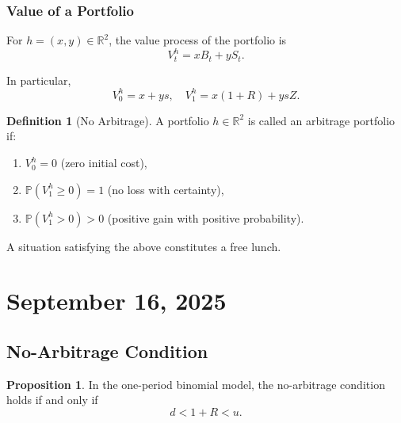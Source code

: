 \documentclass[12pt,a4paper]{article}
\theoremstyle{definition}
\newtheorem{definition}{Definition}[section]
\newtheorem{proposition}{Proposition}[section]
\newcommand{\R}{\mathbb{R}}
\newcommand{\Prob}{\mathbb{P}}
\begin{document}
\subsubsection{Value of a Portfolio}

For $h = (x,y) \in \R^2$, the value process of the portfolio is
\[
V_t^h = xB_t + yS_t.
\]

In particular,
\[
V_0^h = x + ys, \quad V_1^h = x(1 + R) + ysZ.
\]

\begin{definition}[No Arbitrage]
A portfolio $h \in \R^2$ is called an arbitrage portfolio if:
\begin{enumerate}
\item $V_0^h = 0$ (zero initial cost),
\item $\Prob(V_1^h \geq 0) = 1$ (no loss with certainty),
\item $\Prob(V_1^h > 0) > 0$ (positive gain with positive probability).
\end{enumerate}
A situation satisfying the above constitutes a free lunch.
\end{definition}

\newpage
\section{September 16, 2025}

\subsection{No-Arbitrage Condition}

\begin{proposition}
In the one-period binomial model, the no-arbitrage condition holds if and only if
\[
d < 1 + R < u.
\]
\end{proposition}
\end{document}
